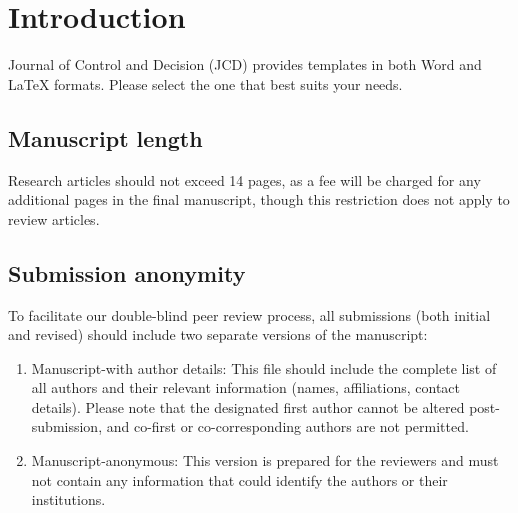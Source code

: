 \documentclass{jcd}
\theoremstyle{plain}
\theoremstyle{definition}
\begin{document}
\maketitlepage
{} %

\begin{abstract}
This template is provided for authors submitting to the Journal of Control and Decision. It outlines the journal's formatting requirements, including title, abstract, keywords, main text, figure insertion, table preparation, references, and author biography. Authors are required to carefully review the instructions and insert the appropriate content in the designated sections. The template's layout parameters must not be altered.
\end{abstract}

\section{Introduction}

Journal of Control and Decision (JCD) provides templates in both Word and LaTeX formats. Please select the one that best suits your needs.

\subsection{Manuscript length}

Research articles should not exceed 14 pages, as a fee will be charged for any additional pages in the final manuscript, though this restriction does not apply to review articles.

\subsection{Submission anonymity}

T\/o facilitate our double-blind peer review process, all submissions (both initial and revised) should include two separate versions of the manuscript:

\begin{enumerate}
  \item	Manuscript-with author details: This file should include the complete list of all authors and their relevant information (names, affiliations, contact details). Please note that the designated first author cannot be altered post-submission, and co-first or co-corresponding authors are not permitted.
  \item	Manuscript-anonymous: This version is prepared for the reviewers and must not contain any information that could identify the authors or their institutions.
\end{enumerate}
\end{document}
